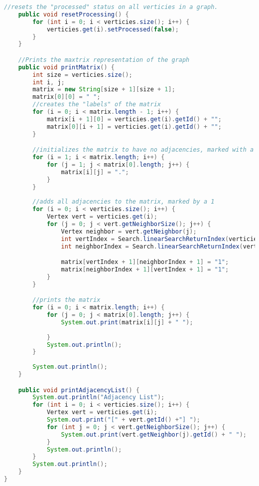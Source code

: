 \documentclass[letterpaper, 10pt,DIV=13]{scrartcl}
\numberwithin{equation}{section} %
\numberwithin{figure}{section} %
\numberwithin{table}{section} %
\begin{document}
\begin{lstlisting}[frame=single, language=java, breaklines]
    //resets the "processed" status on all verticies in a graph.
    public void resetProcessing() {
        for (int i = 0; i < verticies.size(); i++) {
            verticies.get(i).setProcessed(false);
        }
    }

    //Prints the maxtrix representation of the graph
    public void printMatrix() {
        int size = verticies.size();
        int i, j;
        matrix = new String[size + 1][size + 1];
        matrix[0][0] = " ";
        //creates the "labels" of the matrix
        for (i = 0; i < matrix.length - 1; i++) {
            matrix[i + 1][0] = verticies.get(i).getId() + "";
            matrix[0][i + 1] = verticies.get(i).getId() + "";
        }

        //initializes the matrix to have no adjacencies, marked with a period
        for (i = 1; i < matrix.length; i++) {
            for (j = 1; j < matrix[0].length; j++) {
                matrix[i][j] = ".";
            }
        }
        
        //adds all adjacencies to the matrix, marked by a 1
        for (i = 0; i < verticies.size(); i++) {
            Vertex vert = verticies.get(i);
            for (j = 0; j < vert.getNeighborSize(); j++) {
                Vertex neighbor = vert.getNeighbor(j);
                int vertIndex = Search.linearSearchReturnIndex(verticies, vert.getId());
                int neighborIndex = Search.linearSearchReturnIndex(verticies, neighbor.getId());

                matrix[vertIndex + 1][neighborIndex + 1] = "1";
                matrix[neighborIndex + 1][vertIndex + 1] = "1";
            }
        }

        //prints the matrix
        for (i = 0; i < matrix.length; i++) {
            for (j = 0; j < matrix[0].length; j++) {
                System.out.print(matrix[i][j] + " ");
                
            }
            System.out.println();
        }
        
        System.out.println();
    }

    public void printAdjacencyList() {
        System.out.println("Adjacency List");
        for (int i = 0; i < verticies.size(); i++) {
            Vertex vert = verticies.get(i);
            System.out.print("[" + vert.getId() +"] ");
            for (int j = 0; j < vert.getNeighborSize(); j++) {
                System.out.print(vert.getNeighbor(j).getId() + " ");
            }
            System.out.println();
        }
        System.out.println();
    }
}
\end{lstlisting}
\end{document}
